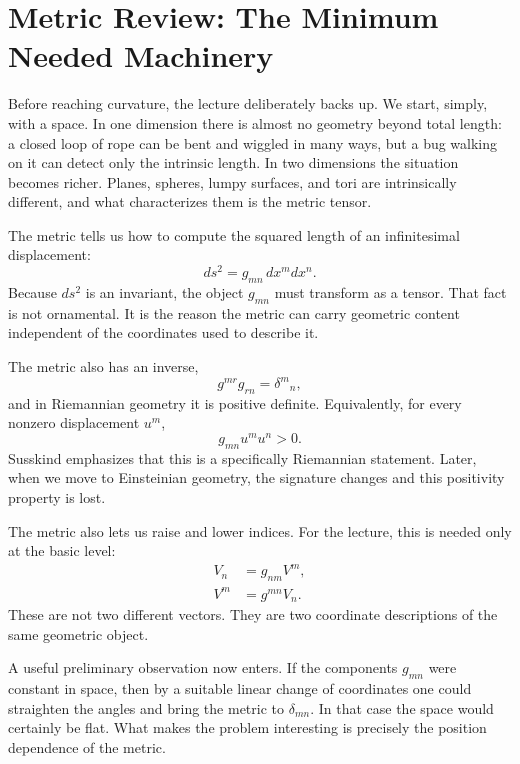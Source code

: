 \section{Metric Review: The Minimum Needed Machinery}

Before reaching curvature, the lecture deliberately backs up. We start, simply, with a space. In one dimension there is almost no geometry beyond total length: a closed loop of rope can be bent and wiggled in many ways, but a bug walking on it can detect only the intrinsic length. In two dimensions the situation becomes richer. Planes, spheres, lumpy surfaces, and tori are intrinsically different, and what characterizes them is the metric tensor.

The metric tells us how to compute the squared length of an infinitesimal displacement:
\begin{equation}
ds^2 = g_{mn}\,dx^m dx^n.
\end{equation}
Because \(ds^2\) is an invariant, the object \(g_{mn}\) must transform as a tensor. That fact is not ornamental. It is the reason the metric can carry geometric content independent of the coordinates used to describe it.

The metric also has an inverse,
\begin{equation}
g^{mr}g_{rn}=\delta^m{}_n,
\end{equation}
and in Riemannian geometry it is positive definite. Equivalently, for every nonzero displacement \(u^m\),
\begin{equation}
g_{mn}u^m u^n>0.
\end{equation}
Susskind emphasizes that this is a specifically Riemannian statement. Later, when we move to Einsteinian geometry, the signature changes and this positivity property is lost.

The metric also lets us raise and lower indices. For the lecture, this is needed only at the basic level:
\begin{align}
V_n &= g_{nm}V^m,\\
V^m &= g^{mn}V_n.
\end{align}
These are not two different vectors. They are two coordinate descriptions of the same geometric object.

A useful preliminary observation now enters. If the components \(g_{mn}\) were constant in space, then by a suitable linear change of coordinates one could straighten the angles and bring the metric to \(\delta_{mn}\). In that case the space would certainly be flat. What makes the problem interesting is precisely the position dependence of the metric.

